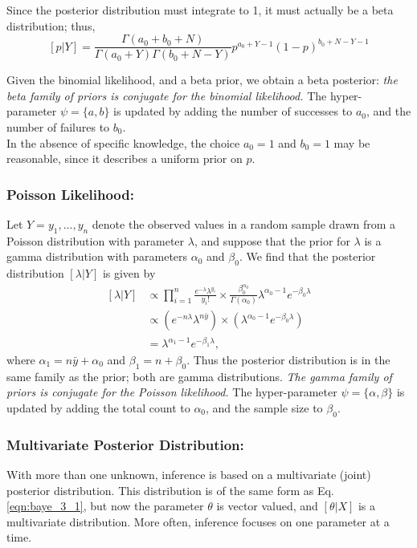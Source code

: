 					Since the posterior distribution must integrate to 1, it must actually be a beta distribution; thus,
					\[
						[p|Y] = \frac{\Gamma(a_0+b_0+N)}{\Gamma(a_0+Y)\Gamma(b_0+N-Y)}p^{a_0+Y-1}(1-p)^{b_0+N-Y-1}
					\]

					Given the binomial likelihood, and a beta prior, we obtain a beta posterior: \textit{the beta family of priors is conjugate for the binomial likelihood.} The hyper-parameter $\psi = \{ a,b\}$ is updated by adding the number of successes to $a_0$, and the number of failures to $b_0$.\\
					In the absence of specific knowledge, the choice $a_0 = 1$ and $b_0 = 1$ may be reasonable, since it describes a uniform prior on $p$. \cite{link2009bayesian}

				\subsubsection{Poisson Likelihood:}
					Let $Y = { y_1,. . . ,y_n}$ denote the observed values in a random sample drawn from a Poisson distribution with parameter $\lambda$, and suppose that the prior for $\lambda$ is a gamma distribution with parameters $\alpha_0$ and $\beta_0$. We find that the posterior distribution $[\lambda|Y ]$ is given by
					\begin{equation*}
						\begin{aligned}
							[\lambda|Y] &\propto \prod_{i=1}^{n}\frac{e^{-\lambda}\lambda^{y_i}}{y_i!} \times \frac{\beta^{\alpha_0}_0}{\Gamma(\alpha_0)}\lambda^{\alpha_0 -1}e^{-\beta_0\lambda}\\
							&\propto (e^{-n\lambda}\lambda^{n\bar{y}})\times (\lambda^{\alpha_0-1}e^{-\beta_0\lambda})\\
							&=\lambda^{\alpha_1-1}e^{-\beta_1\lambda},
						\end{aligned}
					\end{equation*}
					where $\alpha_1 = n\bar{y}+\alpha_0$ and $\beta_1=n+\beta_0$.
					Thus the posterior distribution is in the same family as the prior; both are gamma distributions. \textit{The gamma family of priors is conjugate for the Poisson likelihood.} The hyper-parameter $\psi = \{ \alpha,\beta \}$	is updated by adding the total count to $\alpha_0$, and the sample size to $\beta_0$. \cite{link2009bayesian}


				\subsubsection{ Multivariate Posterior Distribution:}
					With more than one unknown, inference is based on a multivariate (joint) posterior distribution. This distribution is of the same form as Eq. \eqref{eqn:baye_3_1}, but now the parameter $\theta$ is vector valued, and $[\theta|X]$ is a multivariate distribution. More often, inference focuses on one parameter at a time.\\


